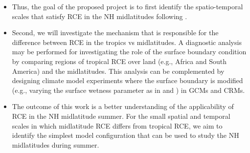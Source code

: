 \documentclass{article}
\begin{document}
\begin{itemize}
    \item Thus, the goal of the proposed project is to first identify the spatio-temporal scales that satisfy RCE in the NH midlatitudes following \cite{jakob2019}. 
    \item Second, we will investigate the mechanism that is responsible for the difference between RCE in the tropics vs midlatitudes. A diagnostic analysis may be performed for investigating the role of the surface boundary condition by comparing regions of tropical RCE over land (e.g., Africa and South America) and the midlatitudes. This analysis can be complemented by designing climate model experiments where the surface boundary is modified (e.g., varying the surface wetness parameter as in \cite{cronin2019} and \cite{fan2021}) in GCMs and CRMs.
    \item The outcome of this work is a better understanding of the applicability of RCE in the NH midlatitude summer. For the small spatial and temporal scales in which midlatitude RCE differs from tropical RCE, we aim to identify the simplest model configuration that can be used to study the NH midlatitudes during summer.
\end{itemize}



\end{document}
